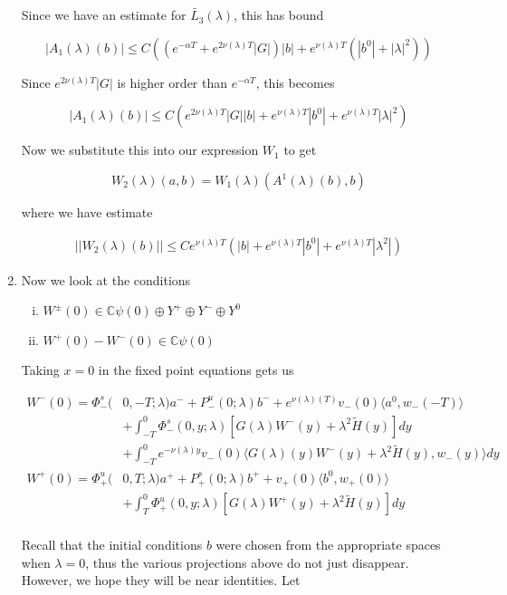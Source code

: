 \documentclass[12pt]{article}
\def\C{{\mathbb C}}
\begin{document}
\begin{enumerate}
Since we have an estimate for $\tilde{L_3}(\lambda)$, this has bound

\[
|A_1(\lambda)(b)| \leq C ( (e^{-\alpha T}+ e^{2\nu(\lambda)T}|G|)|b| + e^{\nu(\lambda)T}( |b^0| + |\lambda|^2))
\]

Since $e^{2\nu(\lambda)T}|G|$ is higher order than $e^{-\alpha T}$, this becomes

\[
|A_1(\lambda)(b)| \leq C ( e^{2\nu(\lambda)T}|G| |b| + e^{\nu(\lambda)T} |b^0| + e^{\nu(\lambda)T} |\lambda|^2)
\]

Now we substitute this into our expression $W_1$ to get 

\[
W_2(\lambda)(a,b) = W_1(\lambda)(A^1(\lambda)(b),b)
\]

where we have estimate

\begin{align*}
||W_2(\lambda)(b)|| \leq C e^{\nu(\lambda)T} (|b| + e^{\nu(\lambda)T} |b^0| + e^{\nu(\lambda)T} |\lambda^2| )
\end{align*}

\item Now we look at the conditions

\begin{enumerate}[(i)]
\item $W^\pm(0) \in \C \psi(0) \oplus Y^+ \oplus Y^- \oplus Y^0$
\item $W^+(0) - W^-(0) \in \C \psi(0) $ 
\end{enumerate}

Taking $x = 0$ in the fixed point equations gets us

\begin{align*}
W^-(0) = \Phi^s_-(&0, -T; \lambda)a^- + P^u_-(0; \lambda)b^- + e^{\nu(\lambda)(T)} v_-(0) \langle a^0, w_-(-T) \rangle \\
&+ \int_{-T}^0 \Phi^s_-(0, y; \lambda) [ G(\lambda)W^-(y) + \lambda^2 \tilde{H}(y) ] dy \\
&+ \int_{-T}^0 
e^{-\nu(\lambda)y} v_-(0) \langle G(\lambda)(y)W^-(y) + \lambda^2 \tilde{H}(y), w_-(y) \rangle dy \\
W^+(0) = \Phi^u_+(&0, T; \lambda)a^+ + P^s_+(0; \lambda)b^+ + v_+(0) \langle b^0, w_+(0) \rangle \\
&+ \int_T^0 \Phi^u_+(0, y; \lambda) [ G(\lambda)W^+(y) + \lambda^2 \tilde{H}(y) ] dy \\
\end{align*}

Recall that the initial conditions $b$ were chosen from the appropriate spaces when $\lambda = 0$, thus the various projections above do not just disappear. However, we hope they will be near identities. Let


\end{enumerate}
\end{document}
